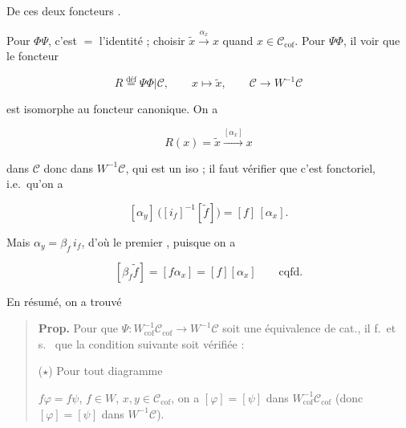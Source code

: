 \documentclass[11pt,a4paper]{article}
\begin{document}

 De ces deux foncteurs
 \ill{}.

Pour $\Phi\Psi$, c'est $=$ l'identité ; \ill{} choisir
$\widetilde{x} \overset{\alpha_x}{\to} x$ \struck{\ill{}} \ill{} quand
$x \in \mathcal{C}_{\mathrm{cof}}$. Pour $\Psi\Phi$, il 
 voir que le foncteur 

\[
R \overset{\text{déf}}{=} \Psi\Phi|\mathcal{C},
\qquad x \longmapsto \widetilde{x},
\qquad \mathcal{C} \longrightarrow W^{-1}\mathcal{C}
\]

est  isomorphe au foncteur canonique. On a

\[
R(x) = \widetilde{x} \overset{[\alpha_x]}{\longrightarrow} x
\]

dans $\mathcal{C}$  donc dans $W^{-1}\mathcal{C}$, qui est un iso ;
il faut \ill{} vérifier que c'est fonctoriel, i.e.\ qu'on a

\[
[\alpha_y]\,\bigl([i_f]^{-1}[\widetilde{f}]\bigr) = [f]\,[\alpha_x].
\]


Mais $\alpha_y = \beta_f\, i_f$, d'où le premier \ill{}, puisque
\struck{\ill{}} on a

\[
[\beta_f \widetilde{f}] = [f\alpha_x] = [f][\alpha_x]
\qquad \text{cqfd.}
\]


En résumé, on a trouvé

\begin{quote}
\textbf{Prop.} Pour que
$\Psi : W_{\mathrm{cof}}^{-1}\mathcal{C}_{\mathrm{cof}} \longrightarrow
W^{-1}\mathcal{C}$ soit une équivalence de cat., il f.\ et s.\  que la
condition suivante soit vérifiée :

($\star$) Pour tout diagramme


 $f\varphi = f\psi$, $f \in W$, $x, y \in
\mathcal{C}_{\mathrm{cof}}$, on a $[\varphi] = [\psi]$ dans
$W_{\mathrm{cof}}^{-1}\mathcal{C}_{\mathrm{cof}}$ (donc $[\varphi] = [\psi]$
dans $W^{-1}\mathcal{C}$).
\end{quote}
\end{document}
